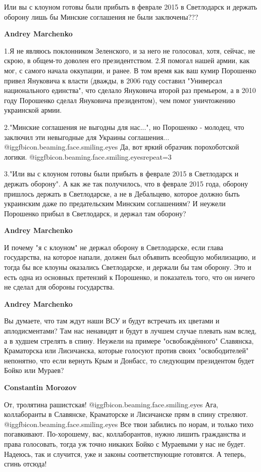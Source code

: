 \begin{itemize}
\begin{itemize}
Или вы с клоуном готовы были прибыть в феврале 2015 в Светлодарск и держать
оборону лишь бы Минские соглашения не были заключены???

\textbf{Andrey Marchenko} 

1.Я не являюсь поклонником Зеленского, и за него не голосовал, хотя, сейчас, не
скрою, в общем-то доволен его президентством. 2.Я помогал нашей армии, как мог,
с самого начала оккупации, и ранее. В том время как ваш кумир Порошенко привел
Януковича к власти (дважды, в 2006 году составил "Универсал национального
единства", что сделало Януковича второй раз премьером, а в 2010 году Порошенко
сделал Януковича президентом), чем помог уничтожению украинской армии. 

2."Минские соглашения не выгодны для нас...", но Порошенко - молодец, что
заключил эти невыгодные для Украины соглашения...  @igg{fbicon.beaming.face.smiling.eyes}  Да, вот яркий образчик
порохоботской логики.  @igg{fbicon.beaming.face.smiling.eyes}{repeat=3}  

3."Или вы с клоуном готовы были прибыть в феврале
2015 в Светлодарск и держать оборону". А как же так получилось, что в феврале
2015 года, оборону пришлось держать в Светлодарске, а не в Дебальцево, которое
должно быть украинским даже по предательским Минским соглашениям? И неужели
Порошенко прибыл в Светлодарск, и держал там оборону?

\textbf{Andrey Marchenko} 

И почему "я с клоуном" не держал оборону в Светлодарске, если глава
государства, на которое напали, должен был объявить всеобщую мобилизацию, и
тогда бы все клоуны оказались Светлодарске, и держали бы там оборону. Это и
есть одна из основных претензий к Порошенко, и показатель того, что он ничего
не сделал для обороны государства.


\textbf{Andrey Marchenko} 

Вы думаете, что там ждут наши ВСУ и будут встречать их цветами и
аплодисментами? Там нас ненавидят и будут в лучшем случае плевать нам вслед, а
в худшем стрелять в спину. Неужели на примере "освобождённого" Славянска,
Краматорска или Лисичанска, которые голосуют против своих "освободителей"
непонятно, что если вернуть Крым и Донбасс, то следующим президентом будет
Бойко или Мураев?

\textbf{Constantin Morozov} 

От, тролятина рашистская!  @igg{fbicon.beaming.face.smiling.eyes} Ага, коллаборанты в Славянске, Краматорске и
Лисичанске прям в спину стреляют.  @igg{fbicon.beaming.face.smiling.eyes}  Все твои забились по норам, и только тихо
погавкивают. По-хорошему, вас, коллаборантов, нужно лишить гражданства и права
голосовать, тогда уж точно никаких Бойко с Мураевыми у нас не будет. Надеюсь,
так и случится, уже и законы соответствующие готовятся. А теперь, сгинь отсюда!



\end{itemize}
\end{itemize}
